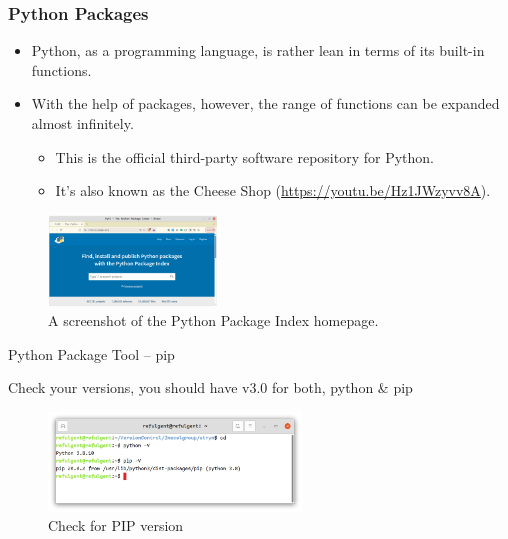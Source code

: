 \documentclass[aspectratio=169,xcolor=dvipsnames,svgnames,x11names,fleqn]{beamer}
\begin{document}
\begin{frame}
    \frametitle{Python Packages}
    \begin{itemize}
        \item Python, as a programming language, is rather lean in terms of its built-in functions.
        \item With the help of packages, however, the range of functions can be expanded almost infinitely.
        \begin{itemize}
            \item This is the official third-party software repository for Python.
            \item It's also known as the Cheese Shop (\url{https://youtu.be/Hz1JWzyvv8A}).
        \end{itemize}
    \end{itemize}
    \begin{figure}
        \centering
        \includegraphics[width=0.4\textwidth]{figures/python_package_index_screenshot.png}
        \caption{A screenshot of the Python Package Index homepage.}
    \end{figure}
\end{frame}

\begin{frame}{Python Package Tool – pip}

    \begin{center}
        Check your versions, you should have v3.0 for both, python \& pip
    \end{center}

    \begin{figure}
        \centering
        \includegraphics[width=0.6\textwidth]{figures/pipversion.png}
        \caption{Check for PIP version}
    \end{figure}
    
\end{frame}
\end{document}
